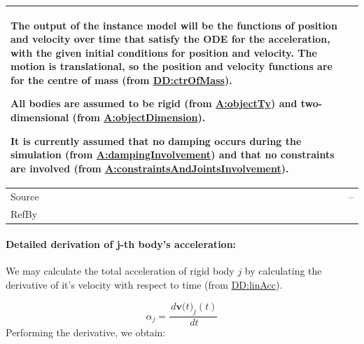 \documentclass[12pt]{article}
\begin{document}
\begin{minipage}{\textwidth}
\begin{tabular}{>{\raggedright}p{}>{\raggedright\arraybackslash}p{}}
        The output of the instance model will be the functions of position and velocity over time that satisfy the ODE for the acceleration, with the given initial conditions for position and velocity. The motion is translational, so the position and velocity functions are for the centre of mass (from \hyperref[DD:ctrOfMass]{DD:ctrOfMass}).
        
        All bodies are assumed to be rigid (from \hyperref[assumpOT]{A:objectTy}) and two-dimensional (from \hyperref[assumpOD]{A:objectDimension}).
        
        It is currently assumed that no damping occurs during the simulation (from \hyperref[assumpDI]{A:dampingInvolvement}) and that no constraints are involved (from \hyperref[assumpCAJI]{A:constraintsAndJointsInvolvement}).
        
\\ \midrule
Source & --
         
\\ \midrule
RefBy & 
\\ \bottomrule
\end{tabular}
\end{minipage}

\paragraph{Detailed derivation of j-th body's acceleration:}
\label{IM:transMotDeriv}
We may calculate the total acceleration of rigid body $j$ by calculating the derivative of it's velocity with respect to time (from \hyperref[DD:linAcc]{DD:linAcc}).

\begin{displaymath}
{α_{j}}=\frac{\,d{\symbf{v}\text{(}t\text{)}_{j}}\left(t\right)}{\,dt}
\end{displaymath}
Performing the derivative, we obtain:
\end{document}
